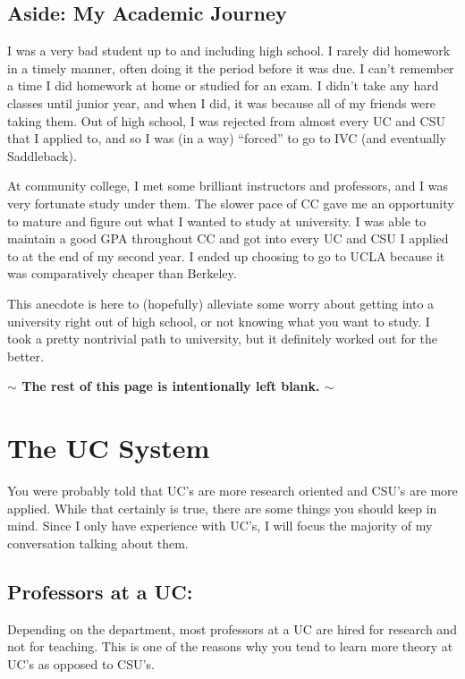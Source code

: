 \documentclass[12pt]{article}
\renewcommand{\bf}[1]{\textbf{{#1}}}
\begin{document}
\subsection{Aside: My Academic Journey}
I was a very bad student up to and including high school. I rarely did homework
in a timely manner, often doing it the period before it was due. I can't
remember a time I did homework at home or studied for an exam. I didn't take any
hard classes until junior year, and when I did, it was because all of my friends
were taking them. Out of high school, I was rejected from almost every UC and
CSU that I applied to, and so I was (in a way) ``forced'' to go to IVC (and
eventually Saddleback).

At community college, I met some brilliant instructors and professors, and I was
very fortunate study under them. The slower pace of CC gave me an opportunity to
mature and figure out what I wanted to study at university. I was able to
maintain a good GPA throughout CC and got into every UC and CSU I applied to at
the end of my second year. I ended up choosing to go to UCLA because it was
comparatively cheaper than Berkeley.
\vspace{1em}

This anecdote is here to (hopefully) alleviate some worry about getting into a
university right out of high school, or not knowing what you want to study. I
took a pretty nontrivial path to university, but it definitely worked out for
the better.
\begin{center}
  \vspace{5em}
  \bf{$\bm{\sim}$ The rest of this page is intentionally left blank. $\bm{\sim}$}
\end{center}

\newpage
\section{The UC System}
\label{sec:uc}
You were probably told that UC's are more research oriented and CSU's are more
applied. While that certainly is true, there are some things you should keep in
mind. Since I only have experience with UC's, I will focus the majority of my
conversation talking about them.

\subsection{Professors at a UC:}
Depending on the department, most professors at a UC are hired for research and
not for teaching. This is one of the reasons why you tend to learn more theory
at UC's as opposed to CSU's.
\end{document}
